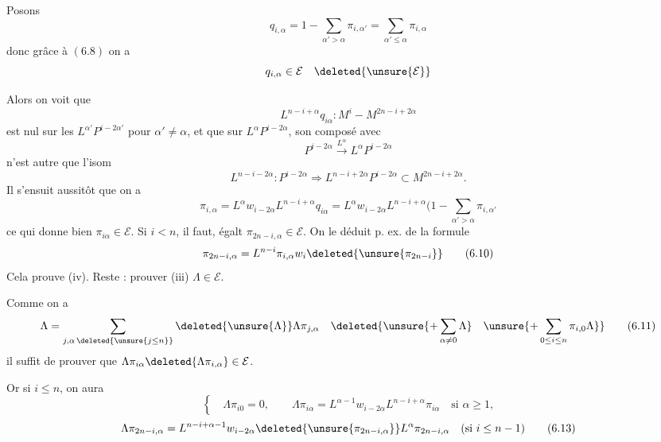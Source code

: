 Posons
\[
q_{i,\alpha}=1-\sum_{\alpha'>\alpha}\pi_{i,\alpha'}=\sum_{\alpha'\leq\alpha}\pi_{i,\alpha}
\]
donc grâce à $(6.8)$ on a
\[
q_{i,\alpha}\in\mathcal E\quad\deleted{\unsure{\mathcal E}}
\]

Alors on voit que
\[
L^{n-i+\alpha}q_{i\alpha}:M^i-M^{2n-i+2\alpha}
\]
est nul sur les $L^{\alpha'}P^{i-2\alpha'}$ pour $\alpha'\neq\alpha$, et que sur $L^\alpha P^{i-2\alpha}$,  son composé avec
\[
P^{i-2\alpha}\xrightarrow{L^\alpha}L^\alpha P^{i-2\alpha}
\]
n'est autre que l'isom
\[
L^{n-i-2\alpha}:P^{i-2\alpha}\Rightarrow L^{n-i+2\alpha}P^{i-2\alpha}\subset M^{2n-i+2\alpha}.
\]
Il s'ensuit aussitôt que on a
\[
\pi_{i,\alpha}=L^\alpha w_{i-2\alpha}L^{n-i+\alpha}q_{i\alpha}=L^\alpha w_{i-2\alpha}L^{n-i+\alpha}(1-\sum_{\alpha'>\alpha}\pi_{i,\alpha'}
\tag{6.9}
\]
ce qui donne bien $\pi_{i\alpha}\in\mathcal E$. 
Si $i<n$, il faut, égalt $\pi_{2n-i,\alpha}\in\mathcal E$. On
le déduit p. ex. de la formule
\[
\pi_{2n-i,\alpha}=L^{n-i}\pi_{i,\alpha}w_i\deleted{\unsure{\pi_{2n-i}}}
\tag{6.10}
\]
Cela prouve  (iv). Reste : prouver (iii) $\Lambda\in\mathcal E$.

Comme on a
\[
\Lambda=\sum_{j,\alpha\,\deleted{\unsure{j\leq n}}}\deleted{\unsure{\Lambda}}\Lambda\pi_{j,\alpha}\quad\deleted{\unsure{+\sum_{\alpha\neq0}\Lambda}\quad\unsure{+\sum_{0\leq i\leq n}\pi_{i,0}\Lambda}}
\tag{6.11}
\]
il suffit de prouver que $\Lambda\pi_{i\alpha}\deleted{\Lambda\pi_{i,\alpha}}\in\mathcal E$.

Or si $i\leq n$, on aura
\[
\left\{\quad\Lambda\pi_{i0}=0,\qquad\Lambda\pi_{i\alpha}=L^{\alpha-1}w_{i-2\alpha}L^{n-i+\alpha}\pi_{i\alpha}\quad\text{si }\alpha\geq1,\right.
\tag{6.12}
\]
\[
\Lambda\pi_{2n-i,\alpha}=L^{n-i+\alpha-1}w_{i-2\alpha}\deleted{\unsure{\pi_{2n-i,\alpha}}}L^\alpha\pi_{2n-i,\alpha}\quad(\text{si }i\leq n-1)
\tag{6.13}
\]


